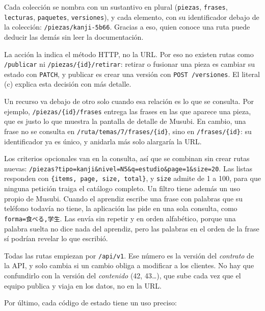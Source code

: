 \documentclass[11pt]{article}
\begin{document}
\begin{description}
  \raggedright
  \item[Sustantivos en plural.] Cada colección se nombra con un sustantivo en plural (\texttt{piezas}, \texttt{frases}, \texttt{lecturas}, \texttt{paquetes}, \texttt{versiones}), y cada elemento, con su identificador debajo de la colección: \texttt{/piezas/kanji-5b66}. Gracias a eso, quien conoce una ruta puede deducir las demás sin leer la documentación.
  \item[Sin verbos en la ruta.] La acción la indica el método HTTP, no la URL. Por eso no existen rutas como \texttt{/publicar} ni \texttt{/piezas/\{id\}/retirar}: retirar o fusionar una pieza es cambiar su estado con \texttt{PATCH}, y publicar es crear una versión con \texttt{POST /versiones}. El literal (c) explica esta decisión con más detalle.
  \item[Jerarquía.] Un recurso va debajo de otro solo cuando esa relación es lo que se consulta. Por ejemplo, \texttt{/piezas/\{id\}/frases} entrega las frases en las que aparece una pieza, que es justo lo que muestra la pantalla de detalle de Musubi. En cambio, una frase no se consulta en \texttt{/ruta/temas/7/frases/\{id\}}, sino en \texttt{/frases/\{id\}}: su identificador ya es único, y anidarla más solo alargaría la URL.
  \item[Filtros y paginación.] Los criterios opcionales van en la consulta, así que se combinan sin crear rutas nuevas: \texttt{/piezas?tipo=kanji\&nivel=N5\&q=estudio\&page=1\&size=20}. Las listas responden con \texttt{\{items, page, size, total\}}, y \texttt{size} admite de 1 a 100, para que ninguna petición traiga el catálogo completo. Un filtro tiene además un uso propio de Musubi. Cuando el aprendiz escribe una frase con palabras que su teléfono todavía no tiene, la aplicación las pide en una sola consulta, como \texttt{forma=食べる,学生}. Las envía sin repetir y en orden alfabético, porque una palabra suelta no dice nada del aprendiz, pero las palabras en el orden de la frase sí podrían revelar lo que escribió.
  \item[Versionado.] Todas las rutas empiezan por \texttt{/api/v1}. Ese número es la versión del \emph{contrato} de la API, y solo cambia si un cambio obliga a modificar a los clientes. No hay que confundirlo con la versión del \emph{contenido} (42, 43\ldots), que sube cada vez que el equipo publica y viaja en los datos, no en la URL.
\end{description}

Por último, cada código de estado tiene un uso preciso:
\end{document}
